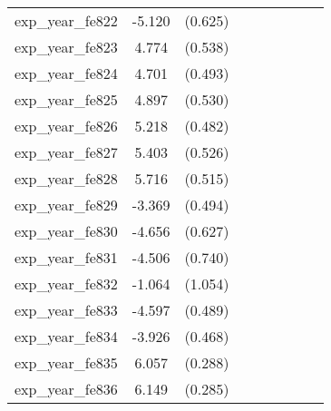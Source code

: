 {\begin{tabular}{l*{4}{cc}}
exp\_year\_fe822&   -5.120\sym{***}&  (0.625)&                  &         &                  &         &                  &         \\
exp\_year\_fe823&    4.774\sym{***}&  (0.538)&                  &         &                  &         &                  &         \\
exp\_year\_fe824&    4.701\sym{***}&  (0.493)&                  &         &                  &         &                  &         \\
exp\_year\_fe825&    4.897\sym{***}&  (0.530)&                  &         &                  &         &                  &         \\
exp\_year\_fe826&    5.218\sym{***}&  (0.482)&                  &         &                  &         &                  &         \\
exp\_year\_fe827&    5.403\sym{***}&  (0.526)&                  &         &                  &         &                  &         \\
exp\_year\_fe828&    5.716\sym{***}&  (0.515)&                  &         &                  &         &                  &         \\
exp\_year\_fe829&   -3.369\sym{***}&  (0.494)&                  &         &                  &         &                  &         \\
exp\_year\_fe830&   -4.656\sym{***}&  (0.627)&                  &         &                  &         &                  &         \\
exp\_year\_fe831&   -4.506\sym{***}&  (0.740)&                  &         &                  &         &                  &         \\
exp\_year\_fe832&   -1.064         &  (1.054)&                  &         &                  &         &                  &         \\
exp\_year\_fe833&   -4.597\sym{***}&  (0.489)&                  &         &                  &         &                  &         \\
exp\_year\_fe834&   -3.926\sym{***}&  (0.468)&                  &         &                  &         &                  &         \\
exp\_year\_fe835&    6.057\sym{***}&  (0.288)&                  &         &                  &         &                  &         \\
exp\_year\_fe836&    6.149\sym{***}&  (0.285)&                  &         &                  &         &                  &         \\

\end{tabular}}
